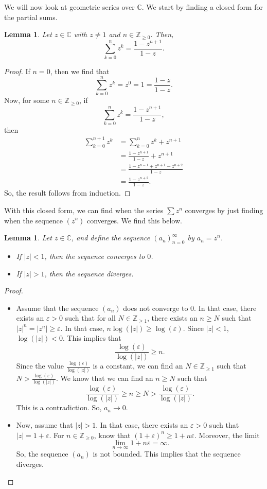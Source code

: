 \documentclass[a4paper, openany]{memoir}
\theoremstyle{definition}
\theoremstyle{plain}
\newtheorem{lemma}[definition]{Lemma}
\begin{document}
We will now look at geometric series over $\mathbb{C}$. We start by finding a closed form for the partial sums.
\begin{lemma}
Let $z \in \mathbb{C}$ with $z \neq 1$ and $n \in \mathbb{Z}_{\geqslant 0}$. Then,
\[\sum_{k=0}^n z^k = \frac{1-z^{n+1}}{1-z}.\]
\end{lemma}
\begin{proof}
If $n = 0$, then we find that
\[\sum_{k=0}^n z^k = z^0 = 1 = \frac{1 - z}{1 - z}.\]
Now, for some $n \in \mathbb{Z}_{\geqslant 0}$, if
\[\sum_{k=0}^n z^k = \frac{1-z^{n+1}}{1-z},\]
then
\begin{align*}
    \sum_{k=0}^{n+1} z^k &= \sum_{k=0}^n z^k + z^{n+1} \\
    &= \frac{1-z^{n+1}}{1-z} + z^{n+1} \\
    &= \frac{1 - z^{n-1} + z^{n+1} - z^{n+2}}{1 - z} \\
    &= \frac{1-z^{n+2}}{1-z}.
\end{align*}
So, the result follows from induction.
\end{proof}
\noindent With this closed form, we can find when the series $\sum z^n$ converges by just finding when the sequence $(z^n)$ converges. We find this below.
\begin{lemma}
Let $z \in \mathbb{C}$, and define the sequence $(a_n)_{n=0}^{\infty}$ by $a_n = z^n$. 
\begin{itemize}
    \item If $|z| < 1$, then the sequence converges to $0$.
    \item If $|z| > 1$, then the sequence diverges.
\end{itemize}
\end{lemma}
\begin{proof}
\hspace*{0pt}
\begin{itemize}
    \item Assume that the sequence $(a_n)$ does not converge to $0$. In that case, there exists an $\varepsilon > 0$ such that for all $N \in \mathbb{Z}_{\geqslant 1}$, there exists an $n \geqslant N$ such that $|z|^n = |z^n| \geqslant \varepsilon$. In that case, $n \log (|z|) \geqslant \log (\varepsilon)$. Since $|z| < 1$, $\log (|z|) < 0$. This implies that
    \[\frac{\log (\varepsilon)}{\log (|z|)} \geqslant n.\]
    Since the value $\frac{\log (\varepsilon)}{\log (|z|)}$ is a constant, we can find an $N \in \mathbb{Z}_{\geqslant 1}$ such that $N > \frac{\log(\varepsilon)}{\log (|z|)}$. We know that we can find an $n \geqslant N$ such that
    \[\frac{\log (\varepsilon)}{\log (|z|)} \geqslant n \geqslant N > \frac{\log(\varepsilon)}{\log (|z|)}.\]
    This is a contradiction. So, $a_n \to 0$.
    
    \item Now, assume that $|z| > 1$. In that case, there exists an $\varepsilon > 0$ such that $|z| = 1 + \varepsilon$. For $n \in \mathbb{Z}_{\geqslant 0}$, know that $(1 + \varepsilon)^n \geqslant 1 + n\varepsilon$. Moreover, the limit
    \[\lim_{n \to \infty} 1 + n \varepsilon = \infty.\]
    So, the sequence $(a_n)$ is not bounded. This implies that the sequence diverges.
\end{itemize}
\end{proof}
\end{document}
